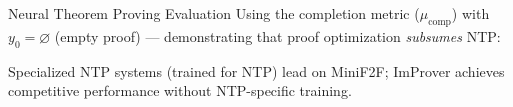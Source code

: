 \documentclass{beamer}
\begin{document}
\begin{frame}{Neural Theorem Proving Evaluation}
\vspace{0.4em}
Using the completion metric ($\mu_{\mathrm{comp}}$) with $y_0 = \varnothing$ (empty proof) --- demonstrating that proof optimization \emph{subsumes} NTP:
\vspace{0.4em}
\begin{center}
\end{center}
\vspace{0.4em}
\begin{minipage}{\textwidth}\small Specialized NTP systems (trained for NTP) lead on MiniF2F; ImProver achieves competitive performance without NTP-specific training.\end{minipage}
\end{frame}
\end{document}
